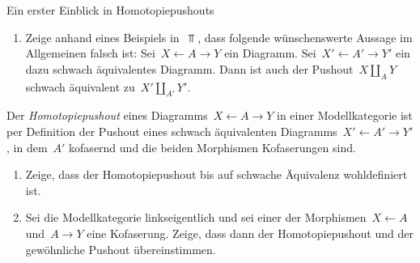 \documentclass{uebblatt}
\begin{document}

\begin{aufgabe}{Ein erster Einblick in Homotopiepushouts}
\begin{enumerate}
\item Zeige anhand eines Beispiels in~$\Top$, dass folgende wünschenswerte
Aussage im Allgemeinen falsch ist: Sei~$X \leftarrow A \rightarrow Y$ ein
Diagramm. Sei~$X' \leftarrow A' \rightarrow Y'$ ein dazu schwach äquivalentes
Diagramm. Dann ist auch der Pushout~$X \amalg_A Y$ schwach äquivalent zu~$X'
\amalg_{A'} Y'$.
\end{enumerate}
Der \emph{Homotopiepushout} eines Diagramms~$X \leftarrow A \rightarrow
Y$ in einer Modellkategorie ist per Definition der Pushout eines schwach
äquivalenten Diagramms~$X' \leftarrow A' \rightarrow Y'$, in dem~$A'$ kofasernd
und die beiden Morphismen Kofaserungen sind.
\begin{enumerate}
\addtocounter{enumi}{1}
\item Zeige, dass der Homotopiepushout bis auf schwache Äquivalenz
wohldefiniert ist.
\item Sei die Modellkategorie linkseigentlich und sei einer der Morphismen~$X
\leftarrow A$ und~$A \rightarrow Y$ eine Kofaserung. Zeige, dass dann der
Homotopiepushout und der gewöhnliche Pushout übereinstimmen.
\end{enumerate}
\end{aufgabe}
\end{document}
